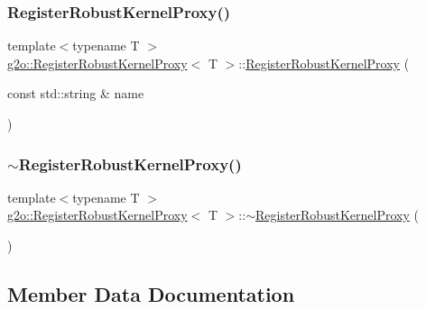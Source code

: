 \subsubsection{\texorpdfstring{Register\+Robust\+Kernel\+Proxy()}{RegisterRobustKernelProxy()}}
{\footnotesize\ttfamily template$<$typename T $>$ \\
\mbox{\hyperlink{classg2o_1_1_register_robust_kernel_proxy}{g2o\+::\+Register\+Robust\+Kernel\+Proxy}}$<$ T $>$\+::\mbox{\hyperlink{classg2o_1_1_register_robust_kernel_proxy}{Register\+Robust\+Kernel\+Proxy}} (\begin{DoxyParamCaption}\item[{const std\+::string \&}]{name }\end{DoxyParamCaption})\hspace{0.3cm}{\ttfamily [inline]}}

\mbox{\label{classg2o_1_1_register_robust_kernel_proxy_a01e3078be667d1faaf2046da6c219eb7}} 
\subsubsection{\texorpdfstring{$\sim$\+Register\+Robust\+Kernel\+Proxy()}{~RegisterRobustKernelProxy()}}
{\footnotesize\ttfamily template$<$typename T $>$ \\
\mbox{\hyperlink{classg2o_1_1_register_robust_kernel_proxy}{g2o\+::\+Register\+Robust\+Kernel\+Proxy}}$<$ T $>$\+::$\sim$\mbox{\hyperlink{classg2o_1_1_register_robust_kernel_proxy}{Register\+Robust\+Kernel\+Proxy}} (\begin{DoxyParamCaption}{ }\end{DoxyParamCaption})\hspace{0.3cm}{\ttfamily [inline]}}



\subsection{Member Data Documentation}
\mbox{\label{classg2o_1_1_register_robust_kernel_proxy_af88f8066f09024c0a94c90d1b99bf1c4}} 
